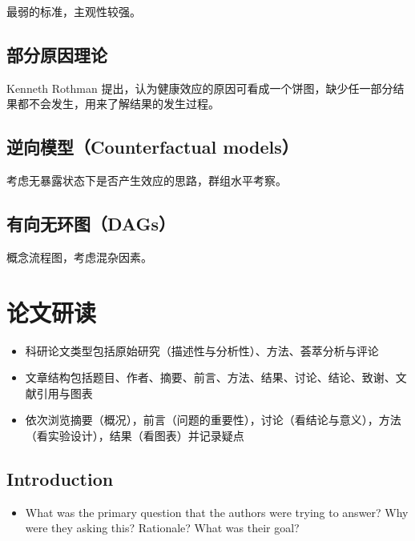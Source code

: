 \documentclass[]{book}
\providecommand{\tightlist}{%
  \setlength{\itemsep}{0pt}\setlength{\parskip}{0pt}}
\begin{document}
最弱的标准，主观性较强。

\hypertarget{ux90e8ux5206ux539fux56e0ux7406ux8bba}{%
\subsection{部分原因理论}\label{ux90e8ux5206ux539fux56e0ux7406ux8bba}}

Kenneth Rothman 提出，认为健康效应的原因可看成一个饼图，缺少任一部分结果都不会发生，用来了解结果的发生过程。

\hypertarget{ux9006ux5411ux6a21ux578bcounterfactual-models}{%
\subsection{逆向模型（Counterfactual models）}\label{ux9006ux5411ux6a21ux578bcounterfactual-models}}

考虑无暴露状态下是否产生效应的思路，群组水平考察。

\hypertarget{ux6709ux5411ux65e0ux73afux56fedags}{%
\subsection{有向无环图（DAGs）}\label{ux6709ux5411ux65e0ux73afux56fedags}}

概念流程图，考虑混杂因素。

\hypertarget{ux8bbaux6587ux7814ux8bfb}{%
\section{论文研读}\label{ux8bbaux6587ux7814ux8bfb}}

\begin{itemize}
\tightlist
\item
  科研论文类型包括原始研究（描述性与分析性）、方法、荟萃分析与评论
\item
  文章结构包括题目、作者、摘要、前言、方法、结果、讨论、结论、致谢、文献引用与图表
\item
  依次浏览摘要（概况），前言（问题的重要性），讨论（看结论与意义），方法（看实验设计），结果（看图表）并记录疑点
\end{itemize}

\hypertarget{introduction-1}{%
\subsection{Introduction}\label{introduction-1}}

\begin{itemize}
\tightlist
\item
  What was the primary question that the authors were trying to answer? Why were they asking this? Rationale? What was their goal?
\end{itemize}
\end{document}
